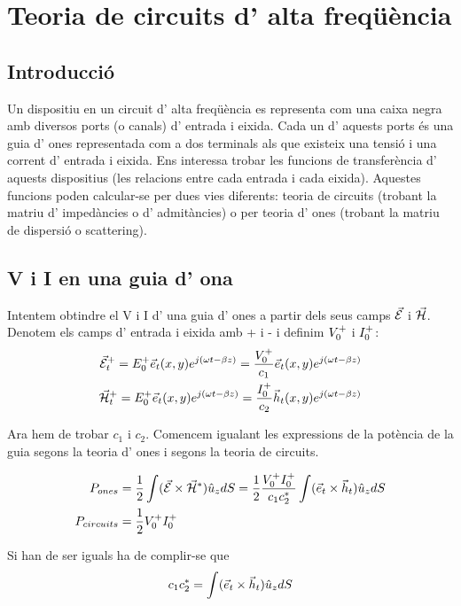 \chapter{Teoria de circuits d' alta freqüència}

\section{Introducció}

Un dispositiu en un circuit d' alta freqüència es representa com una caixa negra amb diversos ports (o canals) d' entrada i eixida. Cada un d' aquests ports és una guia d' ones representada com a dos terminals als que existeix una tensió i una corrent d' entrada i eixida. Ens interessa trobar les funcions de transferència d' aquests dispositius (les relacions entre cada entrada i cada eixida). Aquestes funcions poden calcular-se per dues vies diferents: teoria de circuits (trobant la matriu d' impedàncies o d' admitàncies) o per teoria d' ones (trobant la matriu de dispersió o scattering).

\section{V i I en una guia d' ona}

Intentem obtindre el V i I d' una guia d' ones a partir dels seus camps $\vec{\mathcal{E}}$ i $\vec{\mathcal{H}}$.  Denotem els camps d' entrada i eixida amb + i - i definim $V_0 ^+$ i $I_0 ^+$:
\begin{align}
  \vec{\mathcal{E}}_t ^+ = E_0 ^+ \vec e_t (x, y) e^{j(\omega t - \beta z)} = \frac{V_0 ^+}{c_1} \vec e_t(x, y) e^{j(\omega t - \beta z)} \\
  \vec{\mathcal{H}}_t ^+ = E_0 ^+ \vec e_t (x, y) e^{j(\omega t - \beta z)} = \frac{I_0 ^+}{c_2} \vec h_t(x, y) e^{j(\omega t - \beta z)} 
\end{align}

Ara hem de trobar $c_1$ i $c_2$. Comencem igualant les expressions de la potència de la guia segons la teoria d' ones i segons la teoria de circuits.

\begin{align}
  P_{ones} &= \frac{1}{2} \int  ( \vec{\mathcal{E}} \times \vec{\mathcal{H}} ^* ) \hat u_z dS = \frac{1}{2} \frac{V_0 ^+ I_0 ^+}{c_1 c_2 ^*} \int ( \vec e_t \times \vec h_t ) \hat u_z dS  \\
  P_{circuits} &= \frac{1}{2} V_0 ^+ I_0 ^+ 
\end{align}

Si han de ser iguals ha de complir-se que
\begin{equation}
  c_1 c_2 ^* = \int ( \vec e_t \times \vec h_t ) \hat u_z dS
\end{equation}

